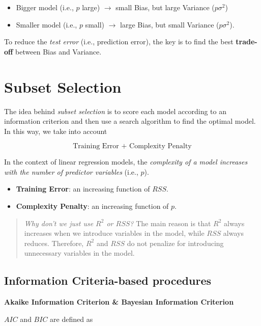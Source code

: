 \documentclass[
]{book}
\begin{document}
\begin{itemize}
\item
  Bigger model (i.e., \(p\) large) \(\rightarrow\) small Bias, but large Variance (\(p\sigma^2\))
\item
  Smaller model (i.e., \(p\) small) \(\rightarrow\) large Bias, but small Variance (\(p\sigma^2\)).
\end{itemize}

To reduce the \emph{test error} (i.e., prediction error), the key is to find the best \textbf{trade-off} between Bias and Variance.

\section{Subset Selection}\label{subset-selection}

The idea behind \emph{subset selection} is to score each model according to an information criterion and then use a search algorithm to find the optimal model. In this way, we take into account

\[\text{Training Error + Complexity Penalty}\]

In the context of linear regression models, the \emph{complexity of a model increases with the number of predictor variables} (i.e., \(p\)).

\begin{itemize}
\item
  \textbf{Training Error}: an increasing function of \(RSS\).
\item
  \textbf{Complexity Penalty}: an increasing function of \(p\).
\end{itemize}

\begin{quote}
\emph{Why don't we just use \(R^2\) or \(RSS\)?} The main reason is that \(R^2\) always increases when we introduce variables in the model, while \(RSS\) always reduces. Therefore, \(R^2\) and \(RSS\) do not penalize for introducing unnecessary variables in the model.
\end{quote}

\subsection{Information Criteria-based procedures}\label{information-criteria-based-procedures}

\textbf{Akaike Information Criterion \& Bayesian Information Criterion}

\(AIC\) and \(BIC\) are defined as
\end{document}
